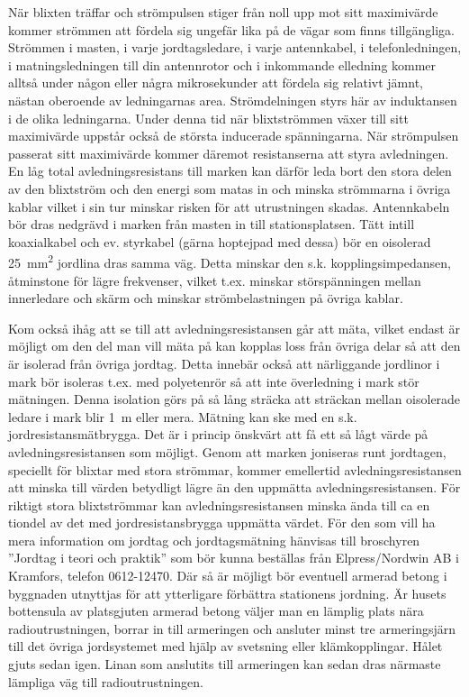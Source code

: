 När blixten träffar och strömpulsen stiger från noll upp mot sitt maximivärde
kommer strömmen att fördela sig ungefär lika på de vägar som finns tillgängliga.
Strömmen i masten, i varje jordtagsledare, i varje antennkabel, i
telefonledningen, i matningsledningen till din antennrotor och i inkommande
elledning kommer alltså under någon eller några mikrosekunder att fördela sig
relativt jämnt, nästan oberoende av ledningarnas area.
Strömdelningen styrs här av induktansen i de olika ledningarna.
Under denna tid när blixtströmmen växer till sitt maximivärde uppstår också de
största inducerade spänningarna.
När strömpulsen passerat sitt maximivärde kommer däremot resistanserna att styra
avledningen.
En låg total avledningsresistans till marken kan därför leda bort den stora
delen av den blixtström och den energi som matas in och minska strömmarna i
övriga kablar vilket i sin tur minskar risken för att utrustningen skadas.
Antennkabeln bör dras nedgrävd i marken från masten in till stationsplatsen.
Tätt intill koaxialkabel och ev. styrkabel (gärna hoptejpad med dessa) bör en
oisolerad \qty{25}{\milli\metre\squared} jordlina dras samma väg.
Detta minskar den s.k. kopplingsimpedansen, åtminstone för lägre frekvenser,
vilket t.ex. minskar störspänningen mellan innerledare och skärm och minskar
strömbelastningen på övriga kablar.

Kom också ihåg att se till att avledningsresistansen går att mäta, vilket endast
är möjligt om den del man vill mäta på kan kopplas loss från övriga delar så att
den är isolerad från övriga jordtag.
Detta innebär också att närliggande jordlinor i mark bör isoleras t.ex. med
polyetenrör så att inte överledning i mark stör mätningen.
Denna isolation görs på så lång sträcka att sträckan mellan oisolerade ledare i
mark blir \qty{1}{\metre} eller mera.
Mätning kan ske med en s.k. jordresistansmätbrygga.
Det är i princip önskvärt att få ett så lågt värde på avledningsresistansen som
möjligt.
Genom att marken joniseras runt jordtagen, speciellt för blixtar med stora
strömmar, kommer emellertid avledningsresistansen att minska till värden
betydligt lägre än den uppmätta avledningsresistansen.
För riktigt stora blixtströmmar kan avledningsresistansen minska ända till ca en
tiondel av det med jordresistansbrygga uppmätta värdet.
För den som vill ha mera information om jordtag och jordtagsmätning hänvisas
till broschyren ''Jordtag i teori och praktik'' som bör kunna beställas från
Elpress/Nordwin AB i Kramfors, telefon 0612-12470.
Där så är möjligt bör eventuell armerad betong i byggnaden utnyttjas för att
ytterligare förbättra stationens jordning.
Är husets bottensula av platsgjuten armerad betong väljer man en lämplig plats
nära radioutrustningen, borrar in till armeringen och ansluter minst tre
armeringsjärn till det övriga jordsystemet med hjälp av svetsning eller
klämkopplingar.
Hålet gjuts sedan igen.
Linan som anslutits till armeringen kan sedan dras närmaste lämpliga väg till
radioutrustningen.

